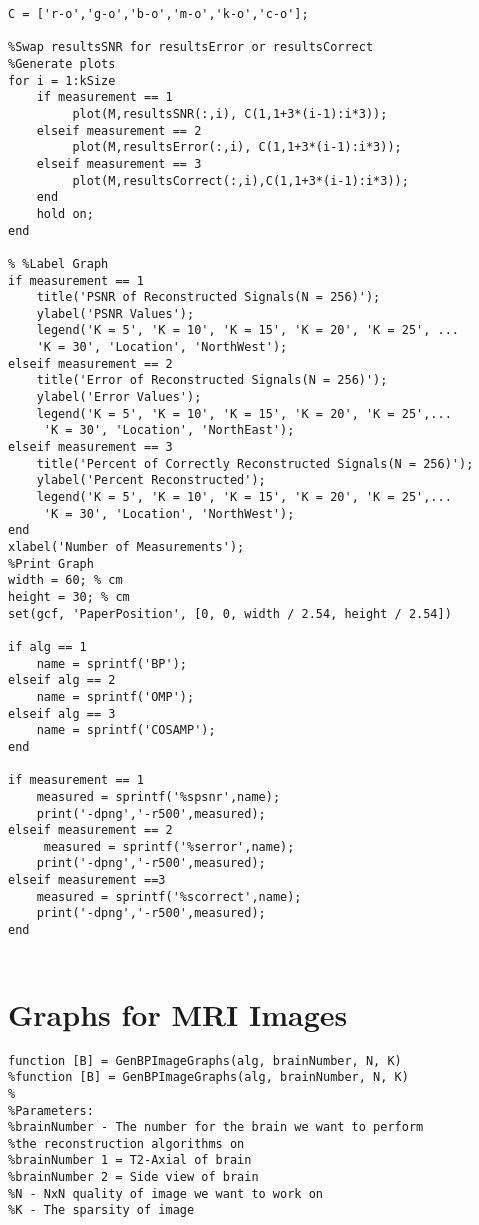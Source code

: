 \documentclass[titlepage,oneside, 12pt]{book}
\theoremstyle{break}
\begin{document}
\begin{appendices}
\begin{lstlisting}[label={lst:ex1DGraphs}]
%Colour code array
C = ['r-o','g-o','b-o','m-o','k-o','c-o'];

%Swap resultsSNR for resultsError or resultsCorrect
%Generate plots
for i = 1:kSize
    if measurement == 1
         plot(M,resultsSNR(:,i), C(1,1+3*(i-1):i*3));
    elseif measurement == 2
         plot(M,resultsError(:,i), C(1,1+3*(i-1):i*3));
    elseif measurement == 3
         plot(M,resultsCorrect(:,i),C(1,1+3*(i-1):i*3));
    end
    hold on; 
end

% %Label Graph
if measurement == 1
    title('PSNR of Reconstructed Signals(N = 256)');
    ylabel('PSNR Values');
    legend('K = 5', 'K = 10', 'K = 15', 'K = 20', 'K = 25', ...
    'K = 30', 'Location', 'NorthWest');
elseif measurement == 2
    title('Error of Reconstructed Signals(N = 256)');
    ylabel('Error Values');
    legend('K = 5', 'K = 10', 'K = 15', 'K = 20', 'K = 25',...
     'K = 30', 'Location', 'NorthEast');
elseif measurement == 3
    title('Percent of Correctly Reconstructed Signals(N = 256)');
    ylabel('Percent Reconstructed');
    legend('K = 5', 'K = 10', 'K = 15', 'K = 20', 'K = 25',...
     'K = 30', 'Location', 'NorthWest');
end
xlabel('Number of Measurements');
%Print Graph
width = 60; % cm 
height = 30; % cm
set(gcf, 'PaperPosition', [0, 0, width / 2.54, height / 2.54])

if alg == 1
    name = sprintf('BP');
elseif alg == 2
    name = sprintf('OMP');
elseif alg == 3
    name = sprintf('COSAMP');
end

if measurement == 1
    measured = sprintf('%spsnr',name);
    print('-dpng','-r500',measured);
elseif measurement == 2
     measured = sprintf('%serror',name);
    print('-dpng','-r500',measured);
elseif measurement ==3
    measured = sprintf('%scorrect',name);
    print('-dpng','-r500',measured);
end
 
\end{lstlisting}


\chapter{Graphs for MRI Images}
\begin{lstlisting}
function [B] = GenBPImageGraphs(alg, brainNumber, N, K)
%function [B] = GenBPImageGraphs(alg, brainNumber, N, K)
%
%Parameters:
%brainNumber - The number for the brain we want to perform 
%the reconstruction algorithms on
%brainNumber 1 = T2-Axial of brain
%brainNumber 2 = Side view of brain 
%N - NxN quality of image we want to work on
%K - The sparsity of image


\end{lstlisting}
\end{appendices}
\end{document}

